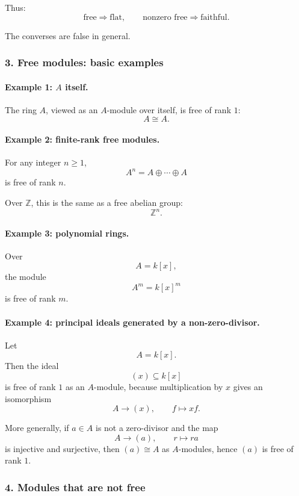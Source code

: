\documentclass[12pt,a4paper]{article}
\theoremstyle{notespace}
\theoremstyle{definition}
\begin{document}
Thus:
\[
\text{free} \Longrightarrow \text{flat},
\qquad
\text{nonzero free} \Longrightarrow \text{faithful}.
\]

The converses are false in general.

\subsubsection{3. Free modules: basic examples}

\paragraph{Example 1: \(A\) itself.}

The ring \(A\), viewed as an \(A\)-module over itself, is free of rank \(1\):
\[
A \cong A.
\]

\paragraph{Example 2: finite-rank free modules.}

For any integer \(n\geq 1\),
\[
A^n=A\oplus \cdots \oplus A
\]
is free of rank \(n\).

Over \(\mathbb Z\), this is the same as a free abelian group:
\[
\mathbb Z^n.
\]

\paragraph{Example 3: polynomial rings.}

Over
\[
A=k[x],
\]
the module
\[
A^m = k[x]^m
\]
is free of rank \(m\).

\paragraph{Example 4: principal ideals generated by a non-zero-divisor.}

Let
\[
A=k[x].
\]
Then the ideal
\[
(x)\subseteq k[x]
\]
is free of rank \(1\) as an \(A\)-module, because multiplication by \(x\) gives an isomorphism
\[
A \longrightarrow (x),
\qquad
f \longmapsto xf.
\]

More generally, if \(a\in A\) is not a zero-divisor and the map
\[
A \longrightarrow (a),\qquad r\longmapsto ra
\]
is injective and surjective, then \((a)\cong A\) as \(A\)-modules, hence \((a)\) is free of rank \(1\).

\subsubsection{4. Modules that are not free}
\end{document}
